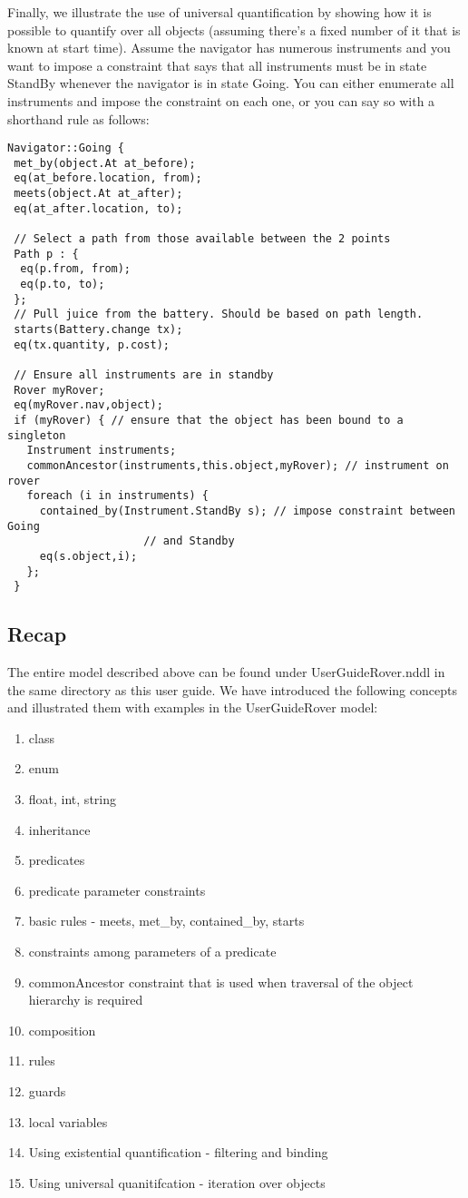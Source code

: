 \documentclass[10pt, letterpaper, twoside]{article}
\begin{document}
Finally, we illustrate the use of universal quantification by showing how
it is possible to quantify over all objects (assuming there's a fixed
number of it that is known at start time).  Assume the navigator has
numerous instruments and you want to impose a constraint that says that all
instruments must be in state StandBy whenever the navigator is in state
Going. You can either enumerate all instruments and impose the constraint
on each one, or you can say so with a shorthand rule as follows:

\begin{verbatim}
Navigator::Going {
 met_by(object.At at_before);
 eq(at_before.location, from);
 meets(object.At at_after);
 eq(at_after.location, to);

 // Select a path from those available between the 2 points
 Path p : {
  eq(p.from, from);
  eq(p.to, to);
 };
 // Pull juice from the battery. Should be based on path length.
 starts(Battery.change tx);
 eq(tx.quantity, p.cost);

 // Ensure all instruments are in standby
 Rover myRover;
 eq(myRover.nav,object);
 if (myRover) { // ensure that the object has been bound to a singleton
   Instrument instruments;
   commonAncestor(instruments,this.object,myRover); // instrument on rover
   foreach (i in instruments) {
     contained_by(Instrument.StandBy s); // impose constraint between Going
					 // and Standby
     eq(s.object,i);
   };
 }
\end{verbatim}

\subsection{Recap}
The entire model described above can be found under UserGuideRover.nddl
in the same directory as this user guide. We have introduced the following
concepts and illustrated them with examples in the UserGuideRover model: 
\begin{enumerate}
\item class
\item enum
\item float, int, string
\item inheritance
\item predicates
\item predicate parameter constraints
\item basic rules - meets, met\_by, contained\_by, starts
\item constraints among parameters of a predicate
\item commonAncestor constraint that is used when traversal of the object
hierarchy is required
\item composition
\item rules
\item guards
\item local variables
\item Using existential quantification - filtering and binding
\item Using universal quanitifcation - iteration over objects
\end{enumerate}
\end{document}
